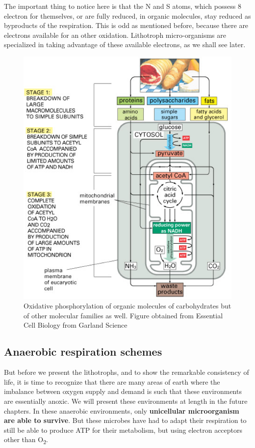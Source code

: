 \documentclass[]{book}
\theoremstyle{definition}
\theoremstyle{definition}
\theoremstyle{definition}
\theoremstyle{remark}
\begin{document}
The important thing to notice here is that the N and S atoms, which
possess 8 electron for themselves, or are fully reduced, in organic
molecules, stay reduced as byproducts of the respiration. This is odd as
mentioned before, because there are electrons available for an other
oxidation. Lithotroph micro-organisms are specialized in taking
advantage of these available electrons, as we shall see later.

\begin{figure}

{\centering \includegraphics[width=0.75\linewidth]{pictures/respiration-3-OM-families} 

}

\caption{Oxidative phosphorylation of organic molecules of carbohydrates but of other molecular families as well. Figure obtained from Essential Cell Biology from Garland Science}\label{fig:respiration-OM}
\end{figure}

\subsection{Anaerobic respiration
schemes}\label{anaerobic-respiration-schemes}

But before we present the lithotrophs, and to show the remarkable
consistency of life, it is time to recognize that there are many areas
of earth where the imbalance between oxygen supply and demand is such
that these environments are essentially anoxic. We will present these
environments at length in the future chapters. In these anaerobic
environments, only \textbf{unicellular microorganism are able to
survive}. But these microbes have had to adapt their respiration to
still be able to produce ATP for their metabolism, but using electron
acceptors other than O\textsubscript{2}.
\end{document}
